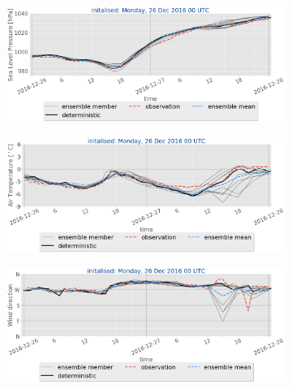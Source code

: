 \begin{figure}\ContinuedFloat
	\centering
    \begin{subfigure}[b]{0.49\textwidth}
		\includegraphics[trim={0.cm 3.6cm 0cm 0cm},clip,
    width=\textwidth]{./fig_sfc_pressure/20161226_00}
    	\caption{}\label{fig:res:sfc_pres26}
	\end{subfigure}
    
    \begin{subfigure}[b]{0.49\textwidth}
    	\includegraphics[trim={0.cm 3.6cm 0cm 0cm},clip,
    width=\textwidth]{./fig_sfc_temp/20161226_00}
    	\caption{}\label{fig:res:sfc_temp26}
    \end{subfigure}
    
    \begin{subfigure}[b]{0.49\textwidth}
    	\includegraphics[trim={0.cm 3.6cm 0cm 0cm},clip,
    width=\textwidth]{./fig_sfc_wd/20161226_00}
    	\caption{}\label{fig:res:sfc_wd26}
    \end{subfigure}
    

\end{figure}
